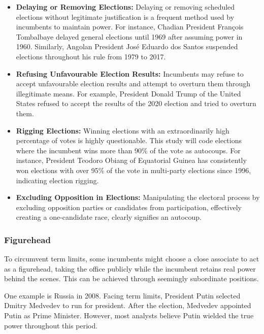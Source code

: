 \documentclass[
  12pt,
]{report}
\begin{document}
\begin{itemize}
\item
  \textbf{Delaying or Removing Elections:} Delaying or removing
  scheduled elections without legitimate justification is a frequent
  method used by incumbents to maintain power. For instance, Chadian
  President François Tombalbaye delayed general elections until 1969
  after assuming power in 1960. Similarly, Angolan President José
  Eduardo dos Santos suspended elections throughout his rule from 1979
  to 2017.
\item
  \textbf{Refusing Unfavourable Election Results:} Incumbents may refuse
  to accept unfavourable election results and attempt to overturn them
  through illegitimate means. For example, President Donald Trump of the
  United States refused to accept the results of the 2020 election and
  tried to overturn them.
\item
  \textbf{Rigging Elections:} Winning elections with an extraordinarily
  high percentage of votes is highly questionable. This study will code
  elections where the incumbent wins more than 90\% of the vote as
  autocoups. For instance, President Teodoro Obiang of Equatorial Guinea
  has consistently won elections with over 95\% of the vote in
  multi-party elections since 1996, indicating election rigging.
\item
  \textbf{Excluding Opposition in Elections:} Manipulating the electoral
  process by excluding opposition parties or candidates from
  participation, effectively creating a one-candidate race, clearly
  signifies an autocoup.
\end{itemize}

\subsubsection*{\texorpdfstring{\textbf{Figurehead}}{Figurehead}}\label{figurehead}

To circumvent term limits, some incumbents might choose a close
associate to act as a figurehead, taking the office publicly while the
incumbent retains real power behind the scenes. This can be achieved
through seemingly subordinate positions.

One example is Russia in 2008. Facing term limits, President Putin
selected Dmitry Medvedev to run for president. After the election,
Medvedev appointed Putin as Prime Minister. However, most analysts
believe Putin wielded the true power throughout this period.
\end{document}
